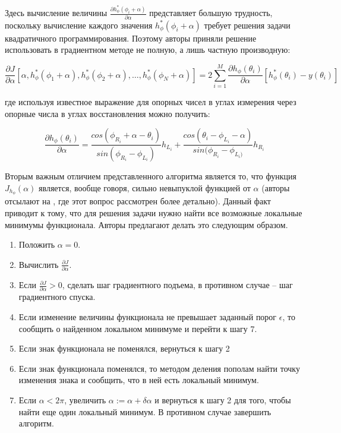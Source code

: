 \documentclass[a4paper, 12pt, titlepage]{article}
\theoremstyle{definition}
\theoremstyle{plain}
\theoremstyle{plain}
\begin{document}
Здесь вычисление величины
$\frac{\partial h_{\phi}^{*}(\phi_{i} + \alpha)}{\partial \alpha}$ представляет
большую трудность, поскольку вычисление каждого значения
$h_{\phi}^{*}(\phi_{i} + \alpha)$ требует решения задачи квадратичного
программирования. Поэтому авторы приняли решение использовать в градиентном
методе не полную, а лишь частную производную:

\begin{equation}
\frac{\partial J}{\partial \alpha} [\alpha,
h_{\phi}^{*}(\phi_{1} + \alpha), h_{\phi}^{*}(\phi_{2} + \alpha), \ldots,
h_{\phi}^{*}(\phi_{N} + \alpha)] =
2 \sum \limits_{i = 1}^{M}  \frac{\partial h_{\phi}(\theta_{i}) }{\partial
\alpha} [h_{\phi}^{*}(\theta_{i}) - y(\theta_{i})]
\end{equation}

где используя известное выражение для опорных чисел в углах измерения через
опорные числа в углах восстановления можно получить:

\begin{equation}
\frac{\partial h_{\phi}(\theta_{i})}{\partial \alpha} =
\frac{cos(\phi_{R_{i}} + \alpha - \theta_{i})}{sin(\phi_{R_{i}} - \phi_{L_{i}})}
h_{L_{i}} +
\frac{cos(\theta_{i} - \phi_{L_{i}} - \alpha)}{sin(\phi_{R_{i}} - \phi_{L_{i})}}
h_{R_{i}}
\end{equation}

Вторым важным отличием представленного алгоритма является то, что функция
$J_{h_{\phi}}(\alpha)$ является, вообще говоря, сильно невыпуклой функцией от
$\alpha$ (авторы отсылают на \cite{thesis/Lele90}, где этот вопрос рассмотрен
более детально). Данный факт приводит к тому, что для решения задачи нужно
найти все возможные локальные минимумы функционала. Авторы предлагают делать это
следующим образом.

\begin{enumerate}
 \item Положить $\alpha = 0$.
 \item Вычислить $\frac{\partial J}{\partial \alpha}$.
 \item Если $\frac{\partial J}{\partial \alpha} > 0$, сделать шаг градиентного
подъема, в противном случае -- шаг градиентного спуска.
 \item Если изменение величины функционала не превышает заданный порог
$\epsilon$, то сообщить о найденном локальном минимуме и перейти к шагу 7.
 \item Если знак функционала не поменялся, вернуться к шагу 2
 \item Если знак функционала поменялся, то методом деления пополам найти точку
изменения знака и сообщить, что в ней есть локальный минимум.
 \item Если $\alpha < 2 \pi$, увеличить $\alpha := \alpha + \delta \alpha$ и
вернуться к шагу 2 для того, чтобы найти еще один локальный минимум. В противном
случае завершить алгоритм.
\end{enumerate}
\end{document}

